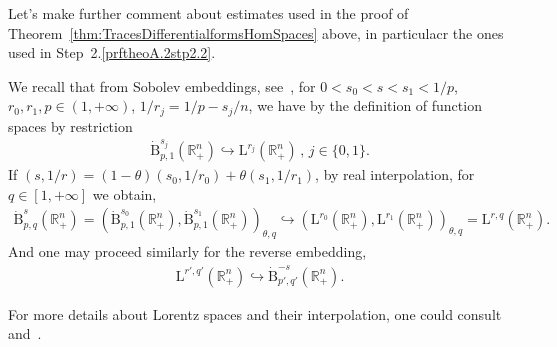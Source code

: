 \documentclass[AHL,Unicode,longabstracts,published]{cedram}
\newcommand{\bbR}{\mathbb{R}}
\newcommand{\rmB}{\mathrm{B}}
\newcommand{\rmL}{\mathrm{L}}
\begin{document}
\begin{rema}
Let's make further comment about estimates used in the proof of Theorem~\ref{thm:TracesDifferentialformsHomSpaces} above, in particulacr the ones used in Step~2.\ref{prftheoA.2stp2.2}.

We recall that from Sobolev embeddings, see~\cite[Proposition~2.39]{bookBahouriCheminDanchin}, for $0<s_0<s<s_1<1/p$, $r_0,r_1,p\in(1,+\infty)$, $1/r_j = 1/p-s_j/n$, we have by the definition of function spaces by restriction
\begin{align*}
\dot{\rmB}^{s_j}_{p,1}\left(\bbR^n_+\right) \hookrightarrow \rmL^{r_j}\left(\bbR^n_+\right) \,,\, j\in\{ 0, 1\} .
\end{align*}
If $(s,1/r)=(1-\theta)(s_0,1/r_0)+ \theta (s_1,1/r_1)$, by real interpolation, for $q\in[1,+\infty]$ we obtain,
\begin{align*}
\dot{\rmB}^{s}_{p,q}\left(\bbR^n_+\right) = \left(\dot{\rmB}^{s_0}_{p,1}\left(\bbR^n_+\right),\dot{\rmB}^{s_1}_{p,1}\left(\bbR^n_+\right)\right)_{\theta,q} \hookrightarrow\left({\rmL}^{r_0}\left(\bbR^n_+\right),{\rmL}^{r_1}\left(\bbR^n_+\right)\right)_{\theta,q} = {\rmL}^{r,q}\left(\bbR^n_+\right) .
\end{align*}
And one may proceed similarly for the reverse embedding,
\begin{align*}
{\rmL}^{r',q'}(\bbR^n_+) \hookrightarrow\dot{\rmB}^{-s}_{p',q'}\left(\bbR^n_+\right).
\end{align*}

For more details about Lorentz spaces and their interpolation, one could consult~\cite[Section~1,~Examples~1.10,~1.11~\&~1.27]{bookLunardiInterpTheory} and~\cite[Chapter~5,~Section~5.3]{BerghLofstrom1976}.
\end{rema}



\end{document}

